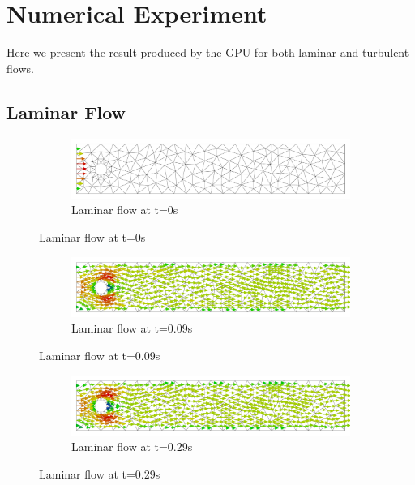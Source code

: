 \section{Numerical Experiment}
Here we present the result produced by the GPU for both laminar and turbulent flows.
\subsection{Laminar Flow}
\begin{figure}[H]
	\centering
	\begin{subfigure}{\textwidth}
   	 	\includegraphics[width=\textwidth]{Figures/numerical_results/laminar_gpu/laminar_velocity_field_0.svg.pdf}
    		\caption{Laminar flow at t=0s}
    \end{subfigure}
\end{figure}

\begin{figure}[H]
	\ContinuedFloat
	\begin{subfigure}{\textwidth}
			\includegraphics[width=\textwidth]{Figures/numerical_results/laminar_gpu/laminar_velocity_field_19.svg.pdf}
		\caption{Laminar flow at t=0.09s}
	\end{subfigure}
\end{figure}

\begin{figure}[H]
	\ContinuedFloat
	\begin{subfigure}{\textwidth}
    \includegraphics[width=\textwidth]{Figures/numerical_results/laminar_gpu/laminar_velocity_field_29.svg.pdf}
    \caption{Laminar flow at t=0.29s}
        \end{subfigure}
\end{figure}

